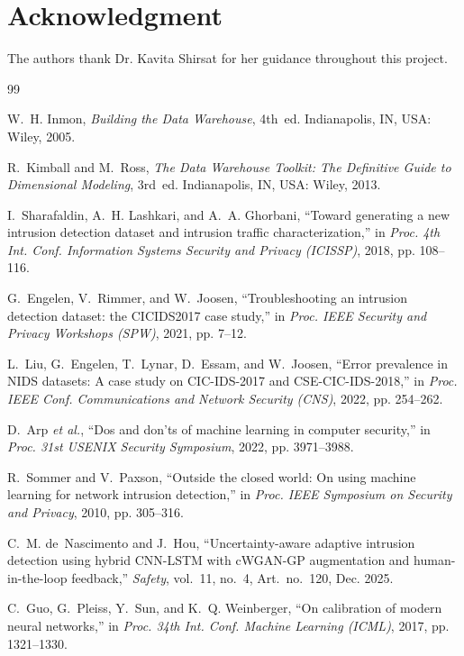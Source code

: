 \documentclass[conference]{IEEEtran}
\begin{document}
\section*{Acknowledgment}
The authors thank Dr. Kavita Shirsat for her guidance throughout this project.

\begin{thebibliography}{99}

W.~H. Inmon, \textit{Building the Data Warehouse}, 4th~ed. Indianapolis, IN, USA: Wiley, 2005.

R.~Kimball and M.~Ross, \textit{The Data Warehouse Toolkit: The Definitive Guide to Dimensional Modeling}, 3rd~ed. Indianapolis, IN, USA: Wiley, 2013.

I.~Sharafaldin, A.~H. Lashkari, and A.~A. Ghorbani, ``Toward generating a new intrusion detection dataset and intrusion traffic characterization,'' in \textit{Proc. 4th Int. Conf. Information Systems Security and Privacy (ICISSP)}, 2018, pp. 108--116.

G.~Engelen, V.~Rimmer, and W.~Joosen, ``Troubleshooting an intrusion detection dataset: the CICIDS2017 case study,'' in \textit{Proc. IEEE Security and Privacy Workshops (SPW)}, 2021, pp. 7--12.

L.~Liu, G.~Engelen, T.~Lynar, D.~Essam, and W.~Joosen, ``Error prevalence in NIDS datasets: A case study on CIC-IDS-2017 and CSE-CIC-IDS-2018,'' in \textit{Proc. IEEE Conf. Communications and Network Security (CNS)}, 2022, pp. 254--262.

D.~Arp \textit{et al.}, ``Dos and don'ts of machine learning in computer security,'' in \textit{Proc. 31st USENIX Security Symposium}, 2022, pp. 3971--3988.

R.~Sommer and V.~Paxson, ``Outside the closed world: On using machine learning for network intrusion detection,'' in \textit{Proc. IEEE Symposium on Security and Privacy}, 2010, pp. 305--316.

C.~M. de~Nascimento and J.~Hou, ``Uncertainty-aware adaptive intrusion detection using hybrid CNN-LSTM with cWGAN-GP augmentation and human-in-the-loop feedback,'' \textit{Safety}, vol.~11, no.~4, Art.~no.~120, Dec. 2025.

C.~Guo, G.~Pleiss, Y.~Sun, and K.~Q. Weinberger, ``On calibration of modern neural networks,'' in \textit{Proc. 34th Int. Conf. Machine Learning (ICML)}, 2017, pp. 1321--1330.


\end{thebibliography}
\end{document}
